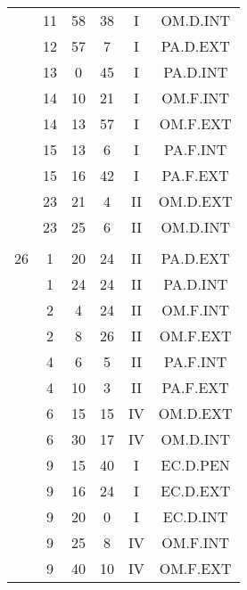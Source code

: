 \documentclass[12pt, a4paper]{article}
\begin{document}
\begin{multicols}{3}
{\begin{tabular}{c c c c c c}
	 	 	 	 & 11 & 58 & 38 & I & OM.D.INT\\%
	 	 	 	 & 12 & 57 & 7 & I & PA.D.EXT\\%
	 	 	 	 & 13 & 0 & 45 & I & PA.D.INT\\%
	 	 	 	 & 14 & 10 & 21 & I & OM.F.INT\\%
	 	 	 	 & 14 & 13 & 57 & I & OM.F.EXT\\%
	 	 	 	 & 15 & 13 & 6 & I & PA.F.INT\\%
	 	 	 	 & 15 & 16 & 42 & I & PA.F.EXT\\%
	 	 	 	 & 23 & 21 & 4 & II & OM.D.EXT\\%
	 	 	 	 & 23 & 25 & 6 & II & OM.D.INT\\%
	 	 	 	 & & & & & \\%
	 	 	 	26 & 1 & 20 & 24 & II & PA.D.EXT\\%
	 	 	 	 & 1 & 24 & 24 & II & PA.D.INT\\%
	 	 	 	 & 2 & 4 & 24 & II & OM.F.INT\\%
	 	 	 	 & 2 & 8 & 26 & II & OM.F.EXT\\%
	 	 	 	 & 4 & 6 & 5 & II & PA.F.INT\\%
	 	 	 	 & 4 & 10 & 3 & II & PA.F.EXT\\%
	 	 	 	 & 6 & 15 & 15 & IV & OM.D.EXT\\%
	 	 	 	 & 6 & 30 & 17 & IV & OM.D.INT\\%
	 	 	 	 & 9 & 15 & 40 & I & EC.D.PEN\\%
	 	 	 	 & 9 & 16 & 24 & I & EC.D.EXT\\%
	 	 	 	 & 9 & 20 & 0 & I & EC.D.INT\\%
	 	 	 	 & 9 & 25 & 8 & IV & OM.F.INT\\%
	 	 	 	 & 9 & 40 & 10 & IV & OM.F.EXT\\%

\end{tabular}}
\end{multicols}
\end{document}
